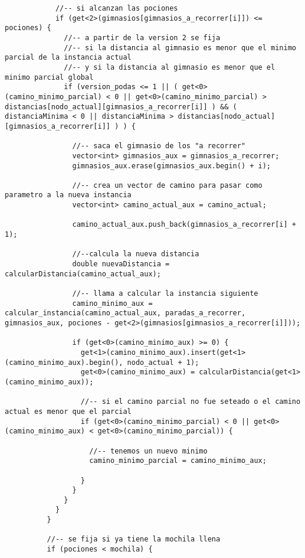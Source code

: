 \begin{lstlisting}
            //-- si alcanzan las pociones
            if (get<2>(gimnasios[gimnasios_a_recorrer[i]]) <= pociones) {
              //-- a partir de la version 2 se fija
              //-- si la distancia al gimnasio es menor que el minimo parcial de la instancia actual
              //-- y si la distancia al gimnasio es menor que el minimo parcial global
              if (version_podas <= 1 || ( get<0>(camino_minimo_parcial) < 0 || get<0>(camino_minimo_parcial) > distancias[nodo_actual][gimnasios_a_recorrer[i]] ) && ( distanciaMinima < 0 || distanciaMinima > distancias[nodo_actual][gimnasios_a_recorrer[i]] ) ) {

                //-- saca el gimnasio de los "a recorrer"
                vector<int> gimnasios_aux = gimnasios_a_recorrer;
                gimnasios_aux.erase(gimnasios_aux.begin() + i);

                //-- crea un vector de camino para pasar como parametro a la nueva instancia
                vector<int> camino_actual_aux = camino_actual;

                camino_actual_aux.push_back(gimnasios_a_recorrer[i] + 1);
                
                //--calcula la nueva distancia
                double nuevaDistancia = calcularDistancia(camino_actual_aux);

                //-- llama a calcular la instancia siguiente
                camino_minimo_aux = calcular_instancia(camino_actual_aux, paradas_a_recorrer, gimnasios_aux, pociones - get<2>(gimnasios[gimnasios_a_recorrer[i]]));

                if (get<0>(camino_minimo_aux) >= 0) {
                  get<1>(camino_minimo_aux).insert(get<1>(camino_minimo_aux).begin(), nodo_actual + 1);
                  get<0>(camino_minimo_aux) = calcularDistancia(get<1>(camino_minimo_aux));

                  //-- si el camino parcial no fue seteado o el camino actual es menor que el parcial
                  if (get<0>(camino_minimo_parcial) < 0 || get<0>(camino_minimo_aux) < get<0>(camino_minimo_parcial)) {
                  
                    //-- tenemos un nuevo minimo
                    camino_minimo_parcial = camino_minimo_aux;
                  
                  }
                }
              }
            }
          }

          //-- se fija si ya tiene la mochila llena
          if (pociones < mochila) {
            

\end{lstlisting}
